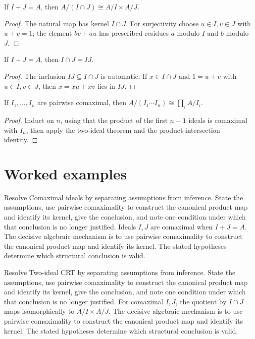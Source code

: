 \begin{theorem}\label{thm:v04-01}
If $I+J=A$, then $A/(I\cap J)\cong A/I\times A/J$.
\begin{proof}
The natural map has kernel $I\cap J$. For surjectivity choose $u\in I,v\in J$ with $u+v=1$; the element $bv+au$ has prescribed residues $a$ modulo $I$ and $b$ modulo $J$.
\end{proof}
\end{theorem}

\begin{theorem}\label{thm:v04-02}
If $I+J=A$, then $I\cap J=IJ$.
\begin{proof}
The inclusion $IJ\subseteq I\cap J$ is automatic. If $x\in I\cap J$ and $1=u+v$ with $u\in I,v\in J$, then $x=xu+xv$ lies in $IJ$.
\end{proof}
\end{theorem}

\begin{theorem}\label{thm:v04-03}
If $I_1,\dots,I_n$ are pairwise comaximal, then $A/(I_1\cdots I_n)\cong\prod_i A/I_i$.
\begin{proof}
Induct on $n$, using that the product of the first $n-1$ ideals is comaximal with $I_n$, then apply the two-ideal theorem and the product-intersection identity.
\end{proof}
\end{theorem}

\section{Worked examples}

\begin{example}\label{ex:v04-worked-01}
Resolve Comaximal ideals by separating assumptions from inference. State the assumptions, use pairwise comaximality to construct the canonical product map and identify its kernel, give the conclusion, and note one condition under which that conclusion is no longer justified. Ideals $I,J$ are comaximal when $I+J=A$. The decisive algebraic mechanism is to use pairwise comaximality to construct the canonical product map and identify its kernel. The stated hypotheses determine which structural conclusion is valid.
\end{example}

\begin{example}\label{ex:v04-worked-02}
Resolve Two-ideal CRT by separating assumptions from inference. State the assumptions, use pairwise comaximality to construct the canonical product map and identify its kernel, give the conclusion, and note one condition under which that conclusion is no longer justified. For comaximal $I,J$, the quotient by $I\cap J$ maps isomorphically to $A/I\times A/J$. The decisive algebraic mechanism is to use pairwise comaximality to construct the canonical product map and identify its kernel. The stated hypotheses determine which structural conclusion is valid.
\end{example}

